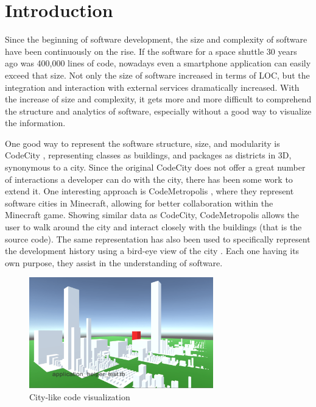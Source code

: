 \documentclass[conference]{IEEEtran}
\begin{document}
\section{Introduction}
Since the beginning of software development, the size and complexity of software have been continuously on the rise.
If the software for a space shuttle 30 years ago was 400,000 lines of code, nowadays even a smartphone application can easily exceed that size.
Not only the size of software increased in terms of LOC, but the integration and interaction with external services dramatically increased.
With the increase of size and complexity, it gets more and more difficult to comprehend the structure and analytics of software, especially without a good way to visualize the information.

One good way to represent the software structure, size, and modularity is CodeCity \cite{Wettel:2011:SSC:1985793.1985868}, representing classes as buildings, and packages as districts in 3D, synonymous to a city.
Since the original CodeCity does not offer a great number of interactions a developer can do with the city, there has been some work to extend it.
One interesting approach is CodeMetropolis \cite{6648194}, where they represent software cities in Minecraft, allowing for better collaboration within the Minecraft game.
Showing similar data as CodeCity, CodeMetropolis allows the user to walk around the city and interact closely with the buildings (that is the source code).
The same representation has also been used to specifically represent the development history using a bird-eye view of the city \cite{Steinbruckner:2010:RDH:1879211.1879239}.
Each one having its own purpose, they assist in the understanding of software.

\begin{figure}[h]
\centering
\includegraphics[width=8cm]{NewRocat.pdf}
\caption{City-like code visualization}
\label{figure:new-Rocat}
\end{figure}
\end{document}

